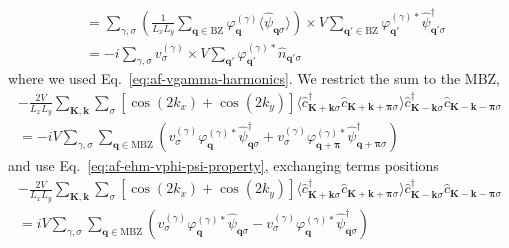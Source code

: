\begin{tabproof}
\begin{align}
		&= \sum_{\gamma,\sigma} \left(
		\frac{1}{L_x L_y} \sum_{\mathbf{q}\in\mathrm{BZ}} \varphi_\mathbf{q}^{(\gamma)}
		\langle
		\hat \psi_{\mathbf{q}\sigma}
		\rangle
		\right) \times V
		\sum_{\mathbf{q}'\in\mathrm{BZ}}
		\varphi_{\mathbf{q}'}^{(\gamma)*}
		\hat \psi_{\mathbf{q}'\sigma}^\dagger \nonumber \\ 
		&= -i\sum_{\gamma,\sigma} v_\sigma^{(\gamma)} \times V
		\sum_{\mathbf{q}'}
		\varphi_{\mathbf{q}'}^{(\gamma)*}
		\hat n_{\mathbf{q}'\sigma}
		\label{eq:af-V-fock-int3-implicit2}
	\end{align}
	where we used Eq.~\eqref{eq:af-vgamma-harmonics}. We restrict the sum to the MBZ,
	\begin{multline*}
		-\frac{2V}{L_x L_y} \sum_{\mathbf{K}, \mathbf{k}} \sum_\sigma [
		\cos \left(
		2k_x
		\right)	+ \cos \left(
		2k_y
		\right)	
		] \langle
		\hat c_{\mathbf{K}+\mathbf{k} \sigma}^\dagger 
		\hat c_{\mathbf{K}+\mathbf{k}+\bm{\pi} \sigma}
		\rangle
		\hat c_{\mathbf{K}-\mathbf{k} \sigma}^\dagger \hat c_{\mathbf{K}-\mathbf{k}-\bm{\pi} \sigma} \\
		= -iV\sum_{\gamma,\sigma}
		\sum_{\mathbf{q}\in\mathrm{MBZ}}
		\left(
		v^{(\gamma)}_\sigma \varphi_\mathbf{q}^{(\gamma)*}
		\hat \psi_{\mathbf{q}\sigma}^\dagger + v^{(\gamma)}_\sigma \varphi_{\mathbf{q}+\bm{\pi}}^{(\gamma)*}
		\hat \psi_{\mathbf{q}+\bm{\pi}\sigma}^\dagger
		\right)
	\end{multline*}
	and use Eq.~\eqref{eq:af-ehm-vphi-psi-property}, exchanging terms positions
	\begin{multline}
		-\frac{2V}{L_x L_y} \sum_{\mathbf{K}, \mathbf{k}} \sum_\sigma [
		\cos \left(
		2k_x
		\right)	+ \cos \left(
		2k_y
		\right)	
		] \langle
		\hat c_{\mathbf{K}+\mathbf{k} \sigma}^\dagger 
		\hat c_{\mathbf{K}+\mathbf{k}+\bm{\pi} \sigma}
		\rangle
		\hat c_{\mathbf{K}-\mathbf{k} \sigma}^\dagger \hat c_{\mathbf{K}-\mathbf{k}-\bm{\pi} \sigma} \\
		= iV\sum_{\gamma,\sigma}
		\sum_{\mathbf{q}\in\mathrm{MBZ}}
		\left(
		v^{(\gamma)}_\sigma \varphi_\mathbf{q}^{(\gamma)*}
		\hat \psi_{\mathbf{q}\sigma} - v^{(\gamma)}_\sigma \varphi_\mathbf{q}^{(\gamma)*}
		\hat \psi_{\mathbf{q}\sigma}^\dagger
		\right)
		\label{eq:af-V-fock-int5-offdiag}
	\end{multline}
	

\end{tabproof}
